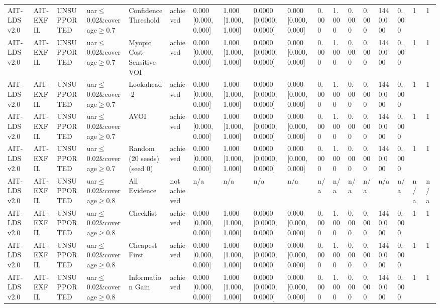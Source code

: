 \begin{table}[!ht]
{\begin{tabular}{llllllllllllllllll}
AIT-LDS v2.0 & AIT-EXFIL & UNSUPPORTED & uar$\le$0.02\&coverage$\ge$0.7 & Confidence Threshold & achieved & 0.000 [0.000, 0.000] & 1.000 [1.000, 1.000] & 0.0000 [0.0000, 0.0000] & 0.000 [0.000, 0.000] & 0.000 & 1.000 & 0.000 & 0.000 & 1440.000 & 0.000 & 1 & 1 \\
AIT-LDS v2.0 & AIT-EXFIL & UNSUPPORTED & uar$\le$0.02\&coverage$\ge$0.7 & Myopic Cost-Sensitive VOI & achieved & 0.000 [0.000, 0.000] & 1.000 [1.000, 1.000] & 0.0000 [0.0000, 0.0000] & 0.000 [0.000, 0.000] & 0.000 & 1.000 & 0.000 & 0.000 & 1440.000 & 0.000 & 1 & 1 \\
AIT-LDS v2.0 & AIT-EXFIL & UNSUPPORTED & uar$\le$0.02\&coverage$\ge$0.7 & Lookahead-2 & achieved & 0.000 [0.000, 0.000] & 1.000 [1.000, 1.000] & 0.0000 [0.0000, 0.0000] & 0.000 [0.000, 0.000] & 0.000 & 1.000 & 0.000 & 0.000 & 1440.000 & 0.000 & 1 & 1 \\
AIT-LDS v2.0 & AIT-EXFIL & UNSUPPORTED & uar$\le$0.02\&coverage$\ge$0.7 & AVOI & achieved & 0.000 [0.000, 0.000] & 1.000 [1.000, 1.000] & 0.0000 [0.0000, 0.0000] & 0.000 [0.000, 0.000] & 0.000 & 1.000 & 0.000 & 0.000 & 1440.000 & 0.000 & 1 & 1 \\
AIT-LDS v2.0 & AIT-EXFIL & UNSUPPORTED & uar$\le$0.02\&coverage$\ge$0.7 & Random (20 seeds) (seed 0) & achieved & 0.000 [0.000, 0.000] & 1.000 [1.000, 1.000] & 0.0000 [0.0000, 0.0000] & 0.000 [0.000, 0.000] & 0.000 & 1.000 & 0.000 & 0.000 & 1440.000 & 0.000 & 1 & 1 \\
AIT-LDS v2.0 & AIT-EXFIL & UNSUPPORTED & uar$\le$0.02\&coverage$\ge$0.8 & All Evidence & not achieved & n/a & n/a & n/a & n/a & n/a & n/a & n/a & n/a & n/a & n/a & n/a & n/a \\
AIT-LDS v2.0 & AIT-EXFIL & UNSUPPORTED & uar$\le$0.02\&coverage$\ge$0.8 & Checklist & achieved & 0.000 [0.000, 0.000] & 1.000 [1.000, 1.000] & 0.0000 [0.0000, 0.0000] & 0.000 [0.000, 0.000] & 0.000 & 1.000 & 0.000 & 0.000 & 1440.000 & 0.000 & 1 & 1 \\
AIT-LDS v2.0 & AIT-EXFIL & UNSUPPORTED & uar$\le$0.02\&coverage$\ge$0.8 & Cheapest First & achieved & 0.000 [0.000, 0.000] & 1.000 [1.000, 1.000] & 0.0000 [0.0000, 0.0000] & 0.000 [0.000, 0.000] & 0.000 & 1.000 & 0.000 & 0.000 & 1440.000 & 0.000 & 1 & 1 \\
AIT-LDS v2.0 & AIT-EXFIL & UNSUPPORTED & uar$\le$0.02\&coverage$\ge$0.8 & Information Gain & achieved & 0.000 [0.000, 0.000] & 1.000 [1.000, 1.000] & 0.0000 [0.0000, 0.0000] & 0.000 [0.000, 0.000] & 0.000 & 1.000 & 0.000 & 0.000 & 1440.000 & 0.000 & 1 & 1 \\

\end{tabular}}
\end{table}
